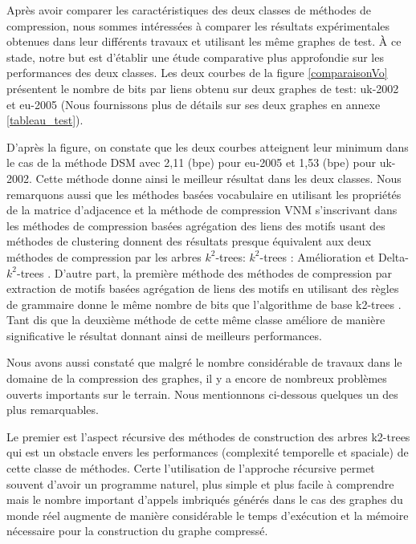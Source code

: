 				
				
				Après avoir comparer les caractéristiques des deux classes de méthodes de compression, nous sommes intéressées à comparer les résultats expérimentales obtenues dans leur différents travaux et utilisant les même graphes de test. À ce stade, notre but est d'établir une étude comparative plus approfondie sur les performances des deux classes. Les deux courbes de la figure \ref{comparaisonVo} présentent le nombre de bits par liens obtenu sur deux graphes de test: uk-2002 et eu-2005 (Nous fournissons plus de détails sur ses deux graphes en annexe \ref{tableau_test}).
				
				D'après la figure, on constate que les deux courbes atteignent leur minimum dans le cas de la méthode DSM \citep{hernandez2014compressed} avec 2,11 (bpe) pour eu-2005 et 1,53 (bpe) pour uk-2002. Cette méthode donne ainsi le meilleur résultat dans les deux classes. 	
Nous remarquons aussi que les méthodes basées vocabulaire en utilisant les propriétés de la matrice d'adjacence et la méthode de compression VNM \citep{buehrer2008scalable} s'inscrivant dans les méthodes de compression basées agrégation des liens des motifs usant des méthodes de clustering donnent des résultats presque équivalent aux deux méthodes de compression par les arbres $k^2$-trees: $k^2$-trees : Amélioration \citep{brisaboa2014compact} et Delta-$k^2$-trees  \citep{zhang2014delta}. D'autre part, la première méthode \citep{claude2010fast} des méthodes de compression par extraction de motifs  basées agrégation de liens des motifs en utilisant des règles de grammaire donne le même nombre de bits que l'algorithme de base k2-trees \citep{brisaboa2009k}. Tant dis que la deuxième méthode \citep{claude2010extended} de cette même classe améliore de manière significative le résultat donnant ainsi de meilleurs performances.

			
				
				
				
								
								Nous avons aussi constaté que malgré le nombre considérable de travaux dans
le domaine de la compression des graphes, il y a encore
de nombreux problèmes ouverts importants sur le terrain. Nous mentionnons ci-dessous quelques un des plus remarquables.
 

Le premier est l'aspect récursive des méthodes de construction des arbres k2-trees qui est un obstacle envers les performances (complexité temporelle et spaciale) de cette classe de méthodes. Certe l'utilisation de l'approche récursive permet souvent d'avoir un programme naturel, plus simple et plus facile à comprendre mais le nombre important d'appels imbriqués générés dans le cas des graphes du monde réel augmente de manière considérable le temps d'exécution et la mémoire nécessaire pour la construction du graphe compressé. 

